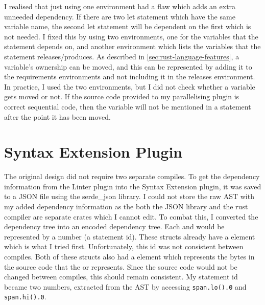 
I realised that just using one environment had a flaw which adds an extra unneeded dependency. If there are two let statement which have the same variable name, the second let statement will be dependent on the first which is not needed. I fixed this by using two environments, one for the variables that the statement depends on, and another environment which lists the variables that the statement releases/produces. As described in \autoref{sec:rust-language-features}, a variable's ownership can be moved, and this can be represented by adding it to the requirements environments and not including it in the releases environment. In practice, I used the two environments, but I did not check whether a variable gets moved or not. If the source code provided to my parallelising plugin is correct sequential code, then the variable will not be mentioned in a statement after the point it has been moved.

\section{Syntax Extension Plugin}
The original design did not require two separate compiles. To get the dependency information from the Linter plugin into the Syntax Extension plugin, it was saved to a JSON file using the serde\_json library. I could not store the raw AST with my added dependency information as the both the JSON library and the rust compiler are separate crates which I cannot edit. To combat this, I converted the dependency tree into an encoded dependency tree. Each  and  would be represented by a number (a statement id). These structs already have a  element which is what I tried first. Unfortunately, this id was not consistent between compiles. Both of these structs also had a  element which represents the bytes in the source code that the  or  represents. Since the source code would not be changed between compiles, this should remain consistent. My statement id became two numbers, extracted from the AST by accessing \texttt{span.lo().0} and \texttt{span.hi().0}.

